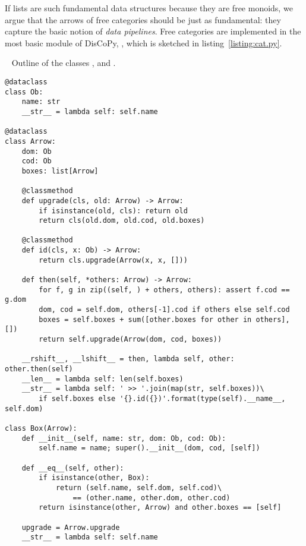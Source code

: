 If lists are such fundamental data structures because they are free monoids, we argue that the arrows of free categories should be just as fundamental: they capture the basic notion of \emph{data pipelines}.
Free categories are implemented in the most basic module of DisCoPy, , which is sketched in listing~\ref{listing:cat.py}.

\begin{python}~\label{listing:cat.py}
{\normalfont Outline of the classes ,  and .}
\begin{verbatim}
@dataclass
class Ob:
    name: str
    __str__ = lambda self: self.name

@dataclass
class Arrow:
    dom: Ob
    cod: Ob
    boxes: list[Arrow]

    @classmethod
    def upgrade(cls, old: Arrow) -> Arrow:
        if isinstance(old, cls): return old
        return cls(old.dom, old.cod, old.boxes)

    @classmethod
    def id(cls, x: Ob) -> Arrow:
        return cls.upgrade(Arrow(x, x, []))

    def then(self, *others: Arrow) -> Arrow:
        for f, g in zip((self, ) + others, others): assert f.cod == g.dom
        dom, cod = self.dom, others[-1].cod if others else self.cod
        boxes = self.boxes + sum([other.boxes for other in others], [])
        return self.upgrade(Arrow(dom, cod, boxes))

    __rshift__, __lshift__ = then, lambda self, other: other.then(self)
    __len__ = lambda self: len(self.boxes)
    __str__ = lambda self: ' >> '.join(map(str, self.boxes))\
        if self.boxes else '{}.id({})'.format(type(self).__name__, self.dom)

class Box(Arrow):
    def __init__(self, name: str, dom: Ob, cod: Ob):
        self.name = name; super().__init__(dom, cod, [self])

    def __eq__(self, other):
        if isinstance(other, Box):
            return (self.name, self.dom, self.cod)\
                == (other.name, other.dom, other.cod)
        return isinstance(other, Arrow) and other.boxes == [self]

    upgrade = Arrow.upgrade
    __str__ = lambda self: self.name
\end{verbatim}
\end{python}

